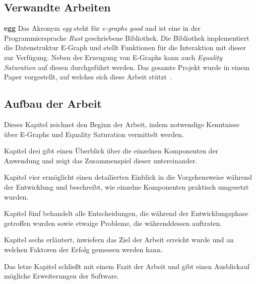 \subsection{Verwandte Arbeiten}\label{sub:verwandtearbeiten}

\noindent\textbf{egg} Das Akronym \textit{egg} steht für \textit{e-graphs good} und ist eine in der Programmiersprache \textit{Rust} geschriebene Bibliothek.
Die Bibliothek implementiert die Datenstruktur E-Graph und stellt Funktionen für die Interaktion mit dieser zur Verfügung.
Neben der Erzeugung von E-Graphs kann auch \textit{Equality Saturation} auf diesen durchgeführt werden.
Das gesamte Projekt wurde in einem Paper vorgestellt, auf welches sich diese Arbeit stützt~\cite{2021-egg}.

\subsection{Aufbau der Arbeit}

\vspace{-2mm}

Dieses Kapitel zeichnet den Beginn der Arbeit, indem notwendige Kenntnisse über E-Graphs und Equality Saturation vermittelt werden.
\vspace{6mm}

\vspace{-2mm}

Kapitel drei gibt einen Überblick über die einzelnen Komponenten der Anwendung und zeigt das Zusammenspiel dieser untereinander.
\vspace{6mm}

\vspace{-2mm}

Kapitel vier ermöglicht einen detailierten Einblick in die Vorgehensweise während der Entwicklung und beschreibt, wie einzelne Komponenten praktisch umgesetzt wurden.
\vspace{6mm}

\vspace{-2mm}

Kapitel fünf behandelt alle Entscheidungen, die während der Entwicklungsphase getroffen wurden sowie etwaige Probleme, die währenddessen auftraten.
\vspace{6mm}

\vspace{-2mm}

Kapitel sechs erläutert, inwiefern das Ziel der Arbeit erreicht wurde und an welchen Faktoren der Erfolg gemessen werden kann.
\vspace{6mm}

\vspace{-2mm}

Das letze Kapitel schließt mit einem Fazit der Arbeit und gibt einen Ausblickauf mögliche Erweiterungen der Software.